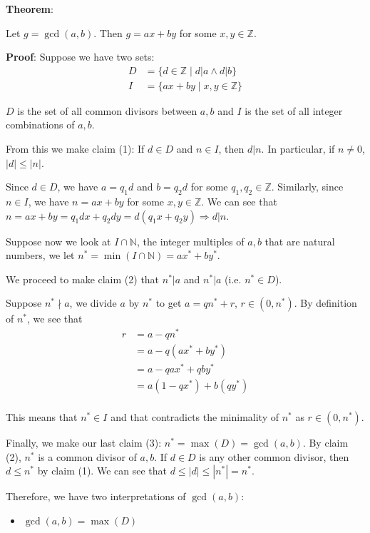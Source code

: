 \documentclass{article}
\begin{document}
\begin{multicols*}{2}
\textbf{Theorem}:

Let $g = \gcd(a, b)$. Then $g = ax + by$ for some $x, y \in \mathbb{Z}$.

\textbf{Proof}: Suppose we have two sets:
\[\begin{aligned}
D &= \{ d \in \mathbb{Z} \;|\; d|a \land d|b \} \\
I &= \{ ax + by \;|\; x,y \in \mathbb{Z}\}
\end{aligned}\]

$D$ is the set of all common divisors between $a, b$ and $I$ is the set of all integer combinations of $a, b$.

From this we make claim (1): If $d \in D$ and $n \in I$, then $d | n$. In particular, if $n \neq 0$, $|d| \leq |n|$.

Since $d \in D$, we have $a = q_1d$ and $b = q_2d$ for some $q_1, q_2 \in \mathbb{Z}$. Similarly, since $n \in I$, we have $n = ax + by$ for some $x, y \in \mathbb{Z}$. We can see that $n = ax + by = q_1dx + q_2dy = d(q_1x + q_2y) \Rightarrow d | n$.

Suppose now we look at $I \cap \mathbb{N}$, the integer multiples of $a,b$ that are natural numbers, we let $n^* = \min(I \cap \mathbb{N}) = ax^*+by^*$.

We proceed to make claim (2) that $n^* | a$ and $n^* | a$ (i.e. $n^* \in D$).

Suppose $n^* \nmid a$, we divide $a$ by $n^*$ to get $a = qn^* + r$, $r \in (0, n^*)$. By definition of $n^*$, we see that \[\begin{aligned}
    r &= a - qn^* \\
    &= a - q(ax^* + by^*)\\
    &=a - qax^* + qby^* \\
    &=a(1 - qx^*) + b(qy^*) \\
\end{aligned}\]

This means that $n^* \in I$ and that contradicts the minimality of $n^*$ as $r \in (0, n^*)$.

Finally, we make our last claim (3): $n^* = \max(D) = \gcd(a, b)$. By claim (2), $n^*$ is a common divisor of $a, b$. If $d \in D$ is any other common divisor, then $d \leq n^*$ by claim (1). We can see that $d \leq |d| \leq |n^*| = n^*$.

Therefore, we have two interpretations of $\gcd(a, b)$:
\begin{itemize}
    \item $\gcd(a, b) = \max(D)$


\end{itemize}
\end{multicols*}
\end{document}
